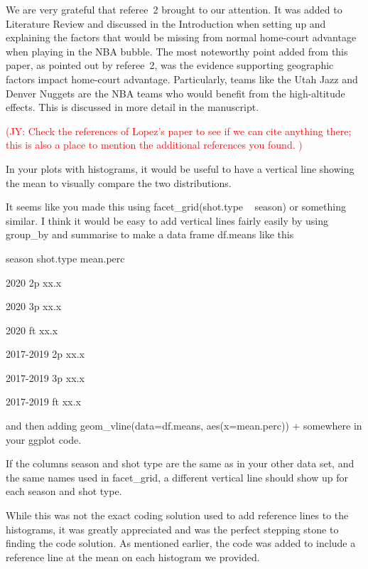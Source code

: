 \documentclass[12pt]{article}
\newcommand{\jy}[1]{\textcolor{red}{(JY: #1)}}
\newenvironment{comment}%
{\begin{quoting}\noindent\small\it\ignorespaces%
  }{\end{quoting}}
\begin{document}
 We are very grateful that referee~2 brought \citet{Lopez} to our attention. It was added to Literature Review and discussed in the Introduction when setting up and explaining the factors that would be missing from normal home-court advantage when playing in the NBA bubble. The most noteworthy point added from this paper, as pointed out by referee~2, was the evidence supporting geographic factors impact home-court advantage. Particularly, teams like the Utah Jazz and Denver Nuggets are the NBA teams who would benefit from the high-altitude effects. This is discussed in more detail in the manuscript.

 \jy{Check the references of Lopez's paper to see if we can cite
   anything there; this is also a place to mention the additional
   references you found. }

\begin{comment}
In your plots with histograms, it would be useful to have a vertical line showing the mean to visually compare
the two distributions.

It seems like you made this using facet\_grid(shot.type ~ season) or something similar. I think it would
be easy to add vertical lines fairly easily by using group\_by and summarise to make a data frame df.means
like this

season shot.type mean.perc

2020 2p xx.x

2020 3p xx.x

2020 ft xx.x

2017-2019 2p xx.x

2017-2019 3p xx.x

2017-2019 ft xx.x

and then adding
geom\_vline(data=df.means, aes(x=mean.perc)) +
somewhere in your ggplot code.

If the columns season and shot type are the same as in your other data
set, and the same names used in facet\_grid, a different vertical line should show up for each season and shot type.
\end{comment}

 While this was not the exact coding solution used to add reference lines to the histograms, it was greatly appreciated and was the perfect stepping stone to finding the code solution. As mentioned earlier, the code was added to include a reference line at the mean on each histogram we provided.
\end{document}
